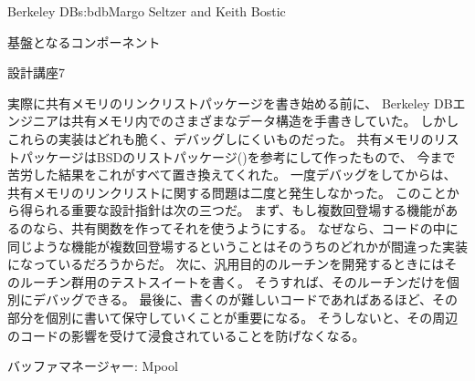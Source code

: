 \begin{aosachapter}{Berkeley DB}{s:bdb}{Margo Seltzer and Keith Bostic}
\begin{aosasect1}{基盤となるコンポーネント}
\begin{aosabox}{設計講座7}

実際に共有メモリのリンクリストパッケージを書き始める前に、
Berkeley DBエンジニアは共有メモリ内でのさまざまなデータ構造を手書きしていた。
しかしこれらの実装はどれも脆く、デバッグしにくいものだった。
共有メモリのリストパッケージはBSDのリストパッケージ()を参考にして作ったもので、
今まで苦労した結果をこれがすべて置き換えてくれた。
一度デバッグをしてからは、共有メモリのリンクリストに関する問題は二度と発生しなかった。
このことから得られる重要な設計指針は次の三つだ。
まず、もし複数回登場する機能があるのなら、共有関数を作ってそれを使うようにする。
なぜなら、コードの中に同じような機能が複数回登場するということはそのうちのどれかが間違った実装になっているだろうからだ。
次に、汎用目的のルーチンを開発するときにはそのルーチン群用のテストスイートを書く。
そうすれば、そのルーチンだけを個別にデバッグできる。
最後に、書くのが難しいコードであればあるほど、その部分を個別に書いて保守していくことが重要になる。
そうしないと、その周辺のコードの影響を受けて浸食されていることを防げなくなる。

\end{aosabox}

\end{aosasect1}

\begin{aosasect1}{バッファマネージャー: Mpool}


\end{aosasect1}
\end{aosachapter}
